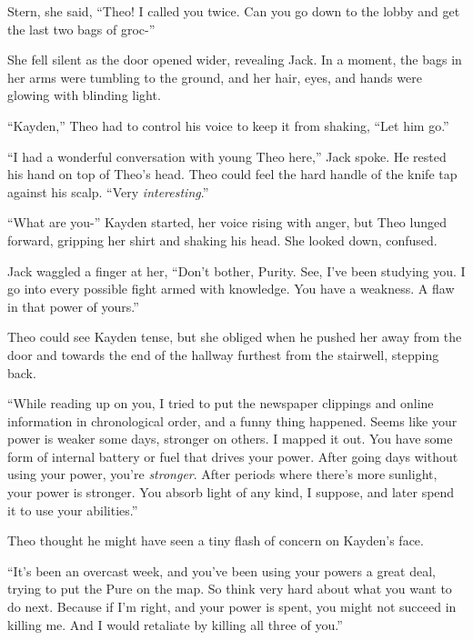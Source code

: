 Stern, she said, ``Theo!  I called you twice.  Can you go down to the lobby and get the last two bags of groc-''



She fell silent as the door opened wider, revealing Jack.  In a moment, the bags in her arms were tumbling to the ground, and her hair, eyes, and hands were glowing with blinding light.



``Kayden,'' Theo had to control his voice to keep it from shaking, ``Let him go.''



``I had a wonderful conversation with young Theo here,'' Jack spoke.  He rested his hand on top of Theo's head.  Theo could feel the hard handle of the knife tap against his scalp.  ``Very \emph{interesting}.''



``What are you-'' Kayden started, her voice rising with anger, but Theo lunged forward, gripping her shirt and shaking his head.  She looked down, confused.



Jack waggled a finger at her, ``Don't bother, Purity.  See, I've been studying you.  I go into every possible fight armed with knowledge.  You have a weakness.  A flaw in that power of yours.''



Theo could see Kayden tense, but she obliged when he pushed her away from the door and towards the end of the hallway furthest from the stairwell, stepping back.



``While reading up on you, I tried to put the newspaper clippings and online information in chronological order, and a funny thing happened.  Seems like your power is weaker some days, stronger on others.  I mapped it out.  You have some form of internal battery or fuel that drives your power.  After going days without using your power, you're \emph{stronger}.  After periods where there's more sunlight, your power is stronger.  You absorb light of any kind, I suppose, and later spend it to use your abilities.''



Theo thought he might have seen a tiny flash of concern on Kayden's face.



``It's been an overcast week, and you've been using your powers a great deal, trying to put the Pure on the map.  So think very hard about what you want to do next.  Because if I'm right, and your power is spent, you might not succeed in killing me.  And I would retaliate by killing all three of you.''



